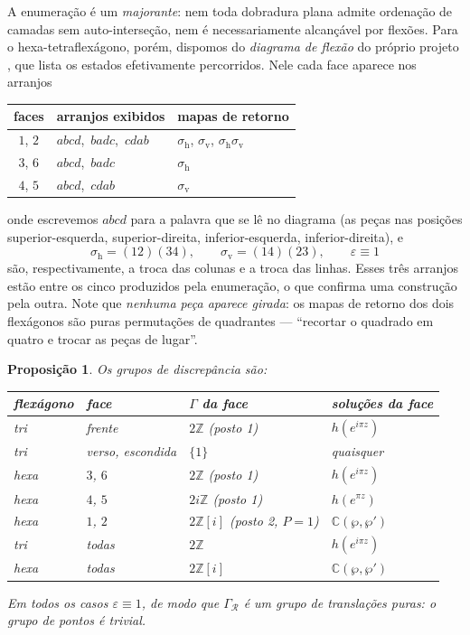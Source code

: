\documentclass[11pt,a4paper]{article}
\theoremstyle{plain}
\newtheorem{proposicao}[teorema]{Proposição}
\theoremstyle{definition}
\theoremstyle{remark}
\newcommand{\C}{\mathbb{C}}
\newcommand{\Z}{\mathbb{Z}}
\newcommand{\Zi}{\Z[i]}
\begin{document}
A enumeração é um \emph{majorante}: nem toda dobradura plana admite ordenação
de camadas sem auto-interseção, nem é necessariamente alcançável por flexões.
Para o hexa-tetraflexágono, porém, dispomos do \emph{diagrama de flexão} do
próprio projeto \cite{enimar}, que lista os estados efetivamente percorridos.
Nele cada face aparece nos arranjos
\begin{center}
\renewcommand{\arraystretch}{1.2}
\begin{tabular}{cll}
\toprule
faces & arranjos exibidos & mapas de retorno\\
\midrule
$1$, $2$ & $abcd$,\ $badc$,\ $cdab$ & $\sigma_{\mathrm h}$, $\sigma_{\mathrm v}$, $\sigma_{\mathrm h}\sigma_{\mathrm v}$\\
$3$, $6$ & $abcd$,\ $badc$ & $\sigma_{\mathrm h}$\\
$4$, $5$ & $abcd$,\ $cdab$ & $\sigma_{\mathrm v}$\\
\bottomrule
\end{tabular}
\end{center}
onde escrevemos $abcd$ para a palavra que se lê no diagrama (as peças nas
posições superior-esquerda, superior-direita, inferior-esquerda,
inferior-direita), e
\[
\sigma_{\mathrm h}=(12)(34),\qquad \sigma_{\mathrm v}=(14)(23),\qquad
\varepsilon\equiv 1
\]
são, respectivamente, a troca das colunas e a troca das linhas. Esses três
arranjos estão entre os cinco produzidos pela enumeração, o que confirma uma
construção pela outra. Note que \emph{nenhuma peça aparece girada}: os mapas de
retorno dos dois flexágonos são puras permutações de quadrantes --- ``recortar
o quadrado em quatro e trocar as peças de lugar''.

\begin{proposicao}\label{prop:gammas}
Os grupos de discrepância são:
\begin{center}
\renewcommand{\arraystretch}{1.2}
\begin{tabular}{llll}
\toprule
flexágono & face & $\Gamma$ da face & soluções da face\\
\midrule
tri  & frente & $2\Z$ (posto 1) & $h(e^{i\pi z})$\\
tri  & verso, escondida & $\{1\}$ & quaisquer\\
hexa & $3$, $6$ & $2\Z$ (posto 1) & $h(e^{i\pi z})$\\
hexa & $4$, $5$ & $2i\Z$ (posto 1) & $h(e^{\pi z})$\\
hexa & $1$, $2$ & $2\Zi$ (posto 2, $P=1$) & $\C(\wp,\wp')$\\
\midrule
tri  & \emph{todas} & $2\Z$ & $h(e^{i\pi z})$\\
hexa & \emph{todas} & $2\Zi$ & $\C(\wp,\wp')$\\
\bottomrule
\end{tabular}
\end{center}
Em todos os casos $\varepsilon\equiv1$, de modo que $\Gamma_{\mathcal R}$ é um
grupo de \emph{translações} puras: o grupo de pontos é trivial.
\end{proposicao}
\end{document}
